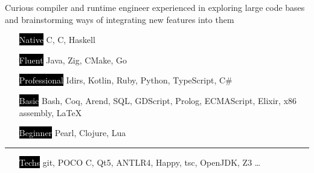\documentclass[9pt]{template/developercv}
\def\Cpp{{C\raisebox{0.05em}{\texttt{++}}}}
\begin{document}
\begin{minipage}[t]{0.35\textwidth}

	Curious compiler and runtime engineer experienced in exploring large code bases and brainstorming ways of integrating new features into them\\
	\bio
\end{minipage}
\hfill
\begin{minipage}[t]{0.55\textwidth}
	\vspace{-0.5\baselineskip}

	\begin{itemize}
		\setlength{\itemsep}{0pt}
		\setlength{\parskip}{0.0\baselineskip}
    \setlength{\parsep}{0pt}
		\item[\colorbox{black}{\textcolor{white}{Native}}] C, \Cpp, Haskell
		\item[\colorbox{black}{\textcolor{white}{Fluent}}] Java, Zig, CMake, Go
		\item[\colorbox{black}{\textcolor{white}{Professional}}] Idirs, Kotlin, Ruby, Python, TypeScript, C\#
		\item[\colorbox{black}{\textcolor{white}{Basic}}] Bash, Coq, Arend, SQL, GDScript, Prolog, ECMAScript, Elixir, x86 assembly, \LaTeX
		\item[\colorbox{black}{\textcolor{white}{Beginner}}] Pearl, Clojure, Lua
	\end{itemize}
	\vspace{-0.5\baselineskip}
	\noindent\hspace{-0.1\textwidth}\rule{1.1\textwidth}{0.4pt}
	\begin{itemize}
		\setlength{\itemsep}{0pt}
		\setlength{\parskip}{0.0\baselineskip}
	\setlength{\parsep}{0pt}
		\item[\colorbox{black}{\textcolor{white}{Techs}}] git, POCO \Cpp, Qt5, ANTLR4, Happy, tsc, OpenJDK, Z3 \dots
	\end{itemize}
\end{minipage}


\end{document}
